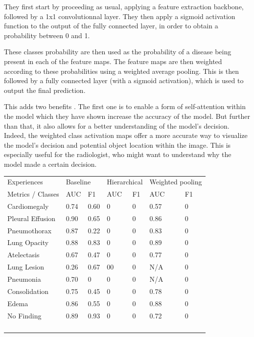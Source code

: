\documentclass[11pt]{article}
\begin{document}
            They first start by proceeding as usual, applying a feature extraction backbone, followed by a 1x1 convolutionnal layer.
            They then apply a sigmoid activation function to the output of the fully connected layer, in order to obtain a probability between 0 and 1.

            These classes probability are then used as the probability of a disease being present in each of the feature maps. The feature maps are then
            weighted according to these probabilities using a weighted average pooling. This is then followed by a fully connected layer (with a sigmoid activation), which is used to output
            the final prediction.


            This adds two benefits . The first one is to enable a form of self-attention within the model which they have shown increase the accuracy of the model.
            But further than that, it also allows for a better understanding of the model's decision. Indeed, the weighted class activation maps offer a more accurate way to visualize the model's decision and potential object location
            within the image. This is especially useful for the radiologist, who might want to understand why the model made a certain decision.



\begin{table}[]
\begin{tabular}{lllllll}
Experiences & \multicolumn{2}{l}{Baseline} & \multicolumn{2}{l}{Hierarchical} & \multicolumn{2}{l}{Weighted pooling} \\
Metrics / Classes & AUC  & F1   & AUC & F1 & AUC  & F1 \\
Cardiomegaly      & 0.74 & 0.60 & 0   & 0  & 0.57 & 0  \\
Pleural Effusion  & 0.90 & 0.65 & 0   & 0  & 0.86 & 0  \\
Pneumothorax      & 0.87 & 0.22 & 0   & 0  & 0.83 & 0  \\
Lung Opacity      & 0.88 & 0.83 & 0   & 0  & 0.89 & 0  \\
Atelectasis       & 0.67 & 0.47 & 0   & 0  & 0.77 & 0  \\
Lung Lesion       & 0.26 & 0.67 & 00  & 0  & N/A  & 0  \\
Pneumonia         & 0.70 & 0    & 0   & 0  & N/A  & 0  \\
Consolidation     & 0.75 & 0.45 & 0   & 0  & 0.78 & 0  \\
Edema             & 0.86 & 0.55 & 0   & 0  & 0.88 & 0  \\
No Finding        & 0.89 & 0.93 & 0   & 0  & 0.72 & 0  \\
                  &      &      &     &    &      &    \\
                  &      &      &     &    &      &    \\
                  &      &      &     &    &      &    \\
                  &      &      &     &    &      &
\end{tabular}
\end{table}
\end{document}
